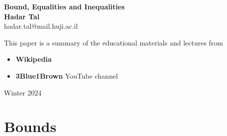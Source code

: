 \documentclass[11pt]{book} %
\begin{document}
\begin{titlepage}
    \begin{center}
     {\huge\bfseries 
    Bound, Equalities and Inequalities     \\}
     \vspace{1.5cm}
     {\Large\bfseries Hadar Tal}\\[5pt]
     hadar.tal@mail.huji.ac.il\\[14pt]
     \vspace{2cm}
     {This paper is a summary of the educational materials and lectures from 
     \begin{itemize}
        \item \textbf{Wikipedia}
        \item \textbf{3Blue1Brown} YouTube channel
     \end{itemize}
     }

     \vfill
    {Winter 2024}
    \end{center}
\end{titlepage}


\frontmatter
\tableofcontents


\mainmatter

\chapter{Bounds}
\end{document}
